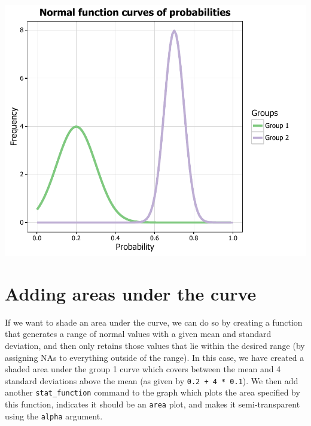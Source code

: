 \begin{Shaded}
\begin{Highlighting}[]
     \NormalTok{(), }
     \NormalTok{(), } \NormalTok{(),}
     \NormalTok{(} \NormalTok{, } \NormalTok{, } \NormalTok{),}
    \NormalTok{(}\NormalTok{))}
\end{Highlighting}
\end{Shaded}

\begin{center}\includegraphics[width=0.6\linewidth]{9_Function_Plots_pdf/function_17-1} \end{center}

\section{Adding areas under the
curve}\label{adding-areas-under-the-curve}

If we want to shade an area under the curve, we can do so by creating a
function that generates a range of normal values with a given mean and
standard deviation, and then only retains those values that lie within
the desired range (by assigning NAs to everything outside of the range).
In this case, we have created a shaded area under the group 1 curve
which covers between the mean and 4 standard deviations above the mean
(as given by \texttt{0.2\ +\ 4\ *\ 0.1}). We then add another
\texttt{stat\_function} command to the graph which plots the area
specified by this function, indicates it should be an \texttt{area}
plot, and makes it semi-transparent using the \texttt{alpha} argument.

